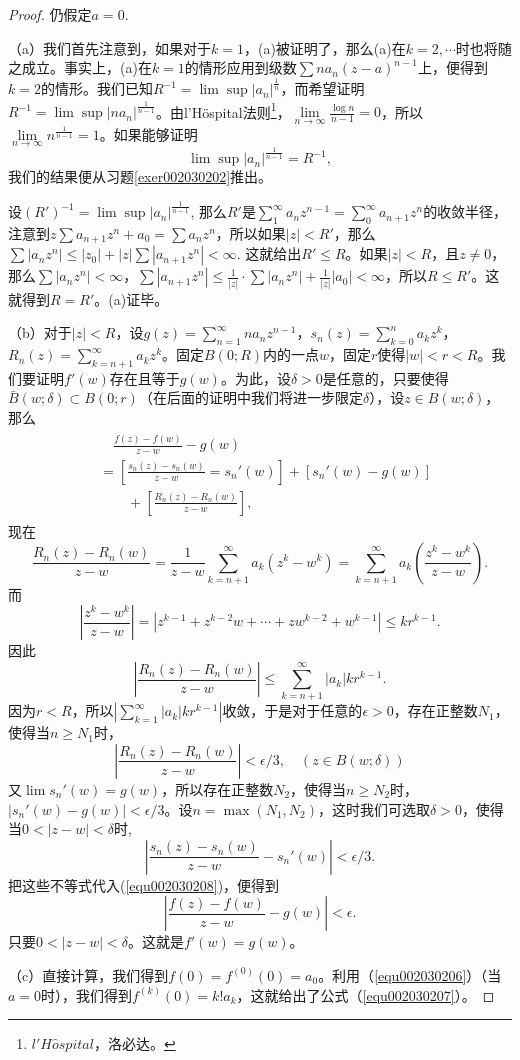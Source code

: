 \begin{proof}
仍假定$a = 0$.

（a）我们首先注意到，如果对于$k=1$，(a)被证明了，那么(a)在$k=2,\cdots$时也将随之成立。事实上，(a)在$k=1$的情形应用到级数$\sum{na_n(z-a)^{n-1}}$上，便得到$k=2$的情形。我们已知$R^{-1} = \lim\sup{|a_n|^{\frac{1}{n}}}$，而希望证明$R^{-1} = \lim\sup{|na_n|^{\frac{1}{n-1}}}$。由l'H\"ospital法则\footnote{$l'H\hat{o}spital$，洛必达。}，$\lim\limits_{n \to \infty}{\frac{\log{n}}{n-1}} = 0$，所以$\lim\limits_{n \to \infty}{n^{\frac{1}{n-1}}} = 1$。如果能够证明
\[
\lim\sup{|a_n|^{\frac{1}{n-1}}} = R^{-1},
\]
我们的结果便从习题\ref{exer002030202}推出。

设$(R')^{-1} = \lim\sup{|a_n|^{\frac{1}{n-1}}}$, 那么$R'$是$\sum\limits_{1}^{\infty}{a_nz^{n-1}} = \sum\limits_{0}^{\infty}{a_{n+1}z^n}$的收敛半径，注意到$z\sum{a_{n+1}z^n} + a_0 = \sum{a_nz^n}$，所以如果$|z| < R'$，那么$\sum{|a_nz^n|} \le |z_0| + |z|\sum{|a_{n+1}z^n|} < \infty$. 这就给出$R' \le R$。如果$|z| < R$，且$z \neq 0$，那么$\sum{|a_nz^n|} < \infty$，$\sum{|a_{n+1}z^n|} \le \frac{1}{|z|} \cdot \sum{|a_nz^n| + \frac{1}{|z|}|a_0|} < \infty$，所以$R \le R'$。这就得到$R = R'$。(a)证毕。

（b）对于$|z| < R$，设$g(z) = \sum\limits_{n=1}^{\infty}{na_nz^{n-1}}$，$s_n(z) = \sum\limits_{k=0}^{n}{a_kz^k}$，$R_n(z) = \sum\limits_{k=n+1}^{\infty}{a_kz^k}$。固定$B(0;R)$内的一点$w$，固定$r$使得$|w|<r < R$。我们要证明$f'(w)$存在且等于$g(w)$。为此，设$\delta > 0$是任意的，只要使得$\bar{B}(w; \delta) \subset B(0; r)$（在后面的证明中我们将进一步限定$\delta$），设$z \in B(w;\delta)$，那么
\begin{gather}\label{equ002030208}
\begin{aligned}
&\quad\frac{f(z)-f(w)}{z - w} - g(w) \\
&=[\frac{s_n(z)-s_n(w)}{z-w} = s_n'(w)] + [s_n'(w) - g(w)] \\
& \quad \quad + [\frac{R_n(z) - R_n(w)}{z-w}],
\end{aligned}
\end{gather}
现在
\[
\frac{R_n(z)-R_n(w)}{z-w} = \frac{1}{z-w}\sum_{k=n+1}^{\infty}{a_k(z^k - w^k)} = \sum_{k=n+1}^{\infty}{a_k(\frac{z^k - w^k}{z-w})}.
\]
而
\[
|\frac{z^k - w^k}{z-w}| = |z^{k-1} + z^{k-2}w + \cdots + zw^{k-2} + w^{k-1}| \le kr^{k-1}.
\]
因此
\[
|\frac{R_n(z) - R_n(w)}{z-w}| \le \sum_{k=n+1}^{\infty}{|a_k|kr^{k-1}}.
\]
因为$r < R$，所以$|\sum\limits_{k=1}^{\infty}{|a_k|kr^{k-1}}|$收敛，于是对于任意的$\epsilon > 0$，存在正整数$N_1$，使得当$n \ge N_1$时，
\[
|\frac{R_n(z) - R_n(w)}{z-w}| < \epsilon/3, \quad (z \in B(w; \delta))
\]
又$\lim{s_n'(w)} = g(w)$，所以存在正整数$N_2$，使得当$n \ge N_2$时，$|s_n'(w) - g(w)| < \epsilon/3$。设$n = \max{(N_1, N_2)}$，这时我们可选取$\delta > 0$，使得当$0 < |z - w| < \delta$时,
\[
|\frac{s_n(z) - s_n(w)}{z-w} - s_n'(w)| < \epsilon / 3.
\]
把这些不等式代入(\ref{equ002030208})，便得到
\[
|\frac{f(z)-f(w)}{z-w} - g(w)| < \epsilon.
\]
只要$0 < |z-w| < \delta$。这就是$f'(w) = g(w)$。

（c）直接计算，我们得到$f(0) = f^{(0)}(0)=a_0$。利用（\ref{equ002030206}）（当$a=0$时），我们得到$f^{(k)}(0) = k!a_k$，这就给出了公式（\ref{equ002030207}）。
\end{proof}

